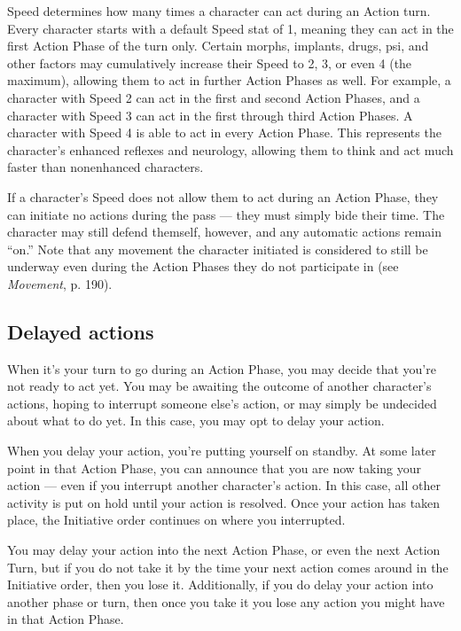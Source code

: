 Speed determines how many times a character can act during an Action turn. Every character starts with a default Speed stat of 1, meaning they can act in the first Action Phase of the turn only. Certain morphs, implants, drugs, psi, and other factors may cumulatively increase their Speed to 2, 3, or even 4 (the maximum), allowing them to act in further Action Phases as well. For example, a character with Speed 2 can act in the first and second Action Phases, and a character with Speed 3 can act in the first through third Action Phases. A character with Speed 4 is able to act in every Action Phase. This represents the character’s enhanced reflexes and neurology, allowing them to think and act much faster than nonenhanced characters.

If a character’s Speed does not allow them to act during an Action Phase, they can initiate no actions during the pass --- they must simply bide their time. The character may still defend themself, however, and any automatic actions remain ``on.'' Note that any movement the character initiated is considered to still be underway even during the Action Phases they do not participate in (see \emph{Movement}, p. 190).


\subsection{Delayed actions}
\label{sec:delayed-actions}

When it’s your turn to go during an Action Phase, you may decide that you’re not ready to act yet. You may be awaiting the outcome of another character’s actions, hoping to interrupt someone else’s action, or may simply be undecided about what to do yet. In this case, you may opt to delay your action.

When you delay your action, you’re putting yourself on standby. At some later point in that Action Phase, you can announce that you are now taking your action --- even if you interrupt another character’s action. In this case, all other activity is put on hold until your action is resolved. Once your action has taken place, the Initiative order continues on where you interrupted.

You may delay your action into the next Action Phase, or even the next Action Turn, but if you do not take it by the time your next action comes around in the Initiative order, then you lose it. Additionally, if you do delay your action into another phase or turn, then once you take it you lose any action you might have in that Action Phase.



